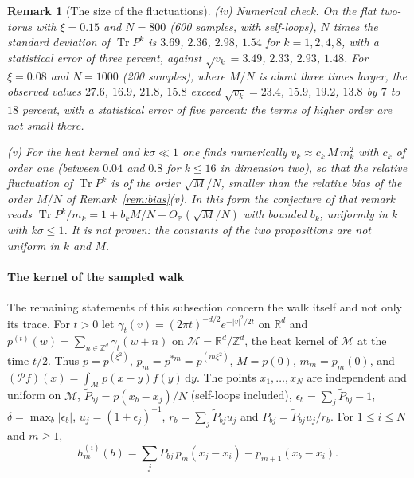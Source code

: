 \documentclass[11pt,a4paper]{article}
\theoremstyle{stmt}
\theoremstyle{defn}
\theoremstyle{rmk}
\newtheorem{remark}[theorem]{Remark}
\numberwithin{equation}{section}
\DeclareMathOperator{\Tr}{Tr}
\newcommand{\M}{\mathcal{M}}
\newcommand{\R}{\mathbb{R}}
\newcommand{\dd}{\mathrm{d}}
\begin{document}
{\begin{remark}[The size of the fluctuations]
(iv) \emph{Numerical check.} On the flat two-torus with $\xi=0.15$ and $N=800$ (600 samples, with self-loops), $N$ times the standard deviation of $\Tr P^k$ is $3.69$, $2.36$, $2.98$, $1.54$ for $k=1,2,4,8$, with a statistical error of three percent, against $\sqrt{v_k}=3.49$, $2.33$, $2.93$, $1.48$. For $\xi=0.08$ and $N=1000$ (200 samples), where $M/N$ is about three times larger, the observed values $27.6$, $16.9$, $21.8$, $15.8$ exceed $\sqrt{v_k}=23.4$, $15.9$, $19.2$, $13.8$ by $7$ to $18$ percent, with a statistical error of five percent: the terms of higher order are not small there.

(v) For the heat kernel and $k\sigma\ll1$ one finds numerically $v_k\approx c_k\,M\,m_k^2$ with $c_k$ of order one (between $0.04$ and $0.8$ for $k\le16$ in dimension two), so that the relative fluctuation of $\Tr P^k$ is of the order $\sqrt M/N$, smaller than the relative bias of the order $M/N$ of Remark~\ref{rem:bias}(v). In this form the conjecture of that remark reads $\Tr P^k/m_k=1+b_kM/N+O_{\mathbb P}(\sqrt M/N)$ with bounded $b_k$, uniformly in $k$ with $k\sigma\le1$. It is not proven: the constants of the two propositions are not uniform in $k$ and $M$.
\end{remark}

\paragraph{The kernel of the sampled walk} The remaining statements of this subsection concern the walk itself and not only its trace. For $t>0$ let $\gamma_t(v)=(2\pi t)^{-d/2}e^{-|v|^2/2t}$ on $\R^d$ and $p^{(t)}(w)=\sum_{n\in\mathbb Z^d}\gamma_t(w+n)$ on $\M=\R^d/\mathbb Z^d$, the heat kernel of $\M$ at the time $t/2$. Thus $p=p^{(\xi^2)}$, $p_m=p^{*m}=p^{(m\xi^2)}$, $M=p(0)$, $m_m=p_m(0)$, and $(\mathcal Pf)(x)=\int_\M p(x-y)f(y)\,\dd y$. The points $x_1,\dots,x_N$ are independent and uniform on $\M$, $\tilde P_{bj}=p(x_b-x_j)/N$ (self-loops included), $\epsilon_b=\sum_j\tilde P_{bj}-1$, $\delta=\max_b|\epsilon_b|$, $u_j=(1+\epsilon_j)^{-1}$, $r_b=\sum_j\tilde P_{bj}u_j$ and $P_{bj}=\tilde P_{bj}u_j/r_b$. For $1\le i\le N$ and $m\ge1$,
\[
h^{(i)}_m(b)=\sum_jP_{bj}\,p_m(x_j-x_i)-p_{m+1}(x_b-x_i).
\]

}
\end{document}
